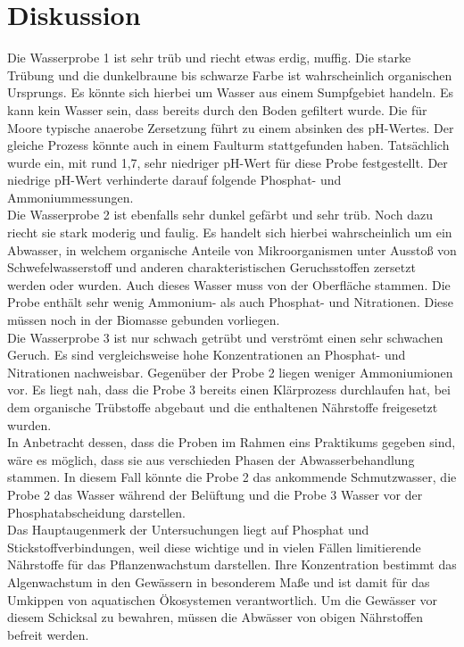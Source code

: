 \chapter{Diskussion}
\label{sec:diskussion}
Die Wasserprobe 1 ist sehr trüb und riecht etwas erdig, muffig. Die starke Trübung und die dunkelbraune bis schwarze Farbe ist wahrscheinlich organischen Ursprungs. Es könnte sich hierbei um Wasser aus einem Sumpfgebiet handeln. Es kann kein Wasser sein, dass bereits durch den Boden gefiltert wurde.
Die für Moore typische anaerobe Zersetzung führt zu einem absinken des pH-Wertes. Der gleiche Prozess könnte auch in einem Faulturm stattgefunden haben. Tatsächlich wurde ein, mit rund 1,7, sehr niedriger pH-Wert für diese Probe festgestellt. Der niedrige pH-Wert verhinderte darauf folgende Phosphat- und Ammoniummessungen.\\

Die Wasserprobe 2 ist ebenfalls sehr dunkel gefärbt und sehr trüb. Noch dazu riecht sie stark moderig und faulig. Es handelt sich hierbei wahrscheinlich um ein Abwasser, in welchem organische Anteile von Mikroorganismen unter Ausstoß von Schwefelwasserstoff und anderen charakteristischen Geruchsstoffen zersetzt werden oder wurden. Auch dieses Wasser muss von der Oberfläche stammen. Die Probe enthält sehr wenig Ammonium- als auch Phosphat- und Nitrationen. Diese müssen noch in der Biomasse gebunden vorliegen.\\

Die Wasserprobe 3 ist nur schwach getrübt und verströmt einen sehr schwachen Geruch. Es sind vergleichsweise hohe Konzentrationen an Phosphat- und Nitrationen nachweisbar. Gegenüber der Probe 2 liegen weniger Ammoniumionen vor. Es liegt nah, dass die Probe 3 bereits einen Klärprozess durchlaufen hat, bei dem organische Trübstoffe abgebaut und die enthaltenen Nährstoffe freigesetzt wurden.\\

In Anbetracht dessen, dass die Proben im Rahmen eins Praktikums gegeben sind, wäre es möglich, dass sie aus verschieden Phasen der Abwasserbehandlung stammen. In diesem Fall könnte die Probe 2 das ankommende Schmutzwasser, die Probe 2 das Wasser während der Belüftung und die Probe 3 Wasser vor der Phosphatabscheidung darstellen. \\

Das Hauptaugenmerk der Untersuchungen liegt auf Phosphat und Stickstoffverbindungen, weil diese wichtige und in vielen Fällen limitierende Nährstoffe für das Pflanzenwachstum darstellen. Ihre Konzentration bestimmt das Algenwachstum in den Gewässern in besonderem Maße und ist damit für das Umkippen von aquatischen Ökosystemen verantwortlich. Um die Gewässer vor diesem Schicksal zu bewahren, müssen die Abwässer von obigen Nährstoffen befreit werden.\\

